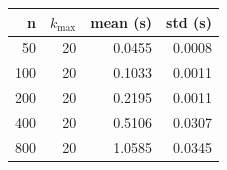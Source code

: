 \begin{tabular}{rrrr}\toprule
n & $k_{\max}$ & mean (s) & std (s)\\\midrule
50 & 20 & 0.0455 & 0.0008\\
100 & 20 & 0.1033 & 0.0011\\
200 & 20 & 0.2195 & 0.0011\\
400 & 20 & 0.5106 & 0.0307\\
800 & 20 & 1.0585 & 0.0345\\
\bottomrule\end{tabular}

